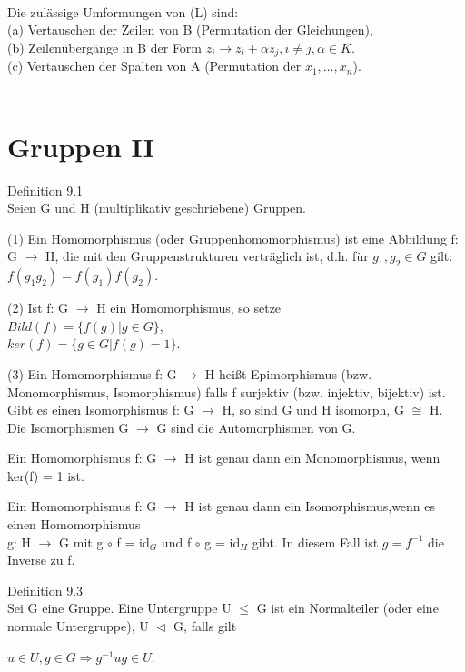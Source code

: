 \documentclass[fontsize=10pt]{scrartcl}
\begin{document}
\\
Die zulässige Umformungen von (L) sind:\\
(a) Vertauschen der Zeilen von B (Permutation der Gleichungen), \\
(b) Zeilenübergänge in B der Form $z_i \to z_i+\alpha z_j, i \neq j,\alpha \in K$.\\
(c) Vertauschen der Spalten von A (Permutation der $x_1, …, x_n$).\\
\\
\newpage
\section{Gruppen II}
Definition 9.1\\
Seien G und H (multiplikativ geschriebene) Gruppen.
\begin{compactenum}
\item[(1)] Ein Homomorphismus (oder Gruppenhomomorphismus) ist eine Abbildung f: G $\to$ H, die mit den Gruppenstrukturen verträglich ist, d.h. für $g_1, g_2 \in G$ gilt:\\
$f(g_1g_2) = f(g_1) f(g_2)$.
\item[(2)] Ist f: G $\to$ H ein Homomorphismus, so setze\\
$Bild(f) = \{f(g) | g \in G\}$,\\
$ker(f) = \{g \in G | f(g) = 1\}$.
\item[(3)] Ein Homomorphismus f: G $\to$ H heißt Epimorphismus (bzw. Monomorphismus, Isomorphismus) falls f surjektiv (bzw. injektiv, bijektiv) ist. Gibt es einen Isomorphismus f: G $\to$ H, so sind G und H isomorph, G $\cong$ H. Die Isomorphismen G $\to$ G sind die Automorphismen von G.
\end{compactenum}
\begin{compactitem}
\item Ein Homomorphismus f: G $\to$ H ist genau dann ein Monomorphismus, wenn ker(f) = {1} ist.
\item Ein Homomorphismus f: G $\to$ H ist genau dann ein Isomorphismus,wenn es einen Homomorphismus \\g: H $\to$ G mit g $\circ$ f = id$_G$ und f $\circ$ g = id$_H$ gibt. In diesem Fall ist $g=f^{-1}$ die Inverse zu f.\\
\end{compactitem}
Definition 9.3\\
Sei G eine Gruppe. Eine Untergruppe U $\le$ G ist ein Normalteiler (oder eine normale Untergruppe), U $\vartriangleleft$ G, falls gilt
\begin{center}
$u \in U, g \in G \Rightarrow g^{-1}ug \in U$.
\end{center}
\end{document}
